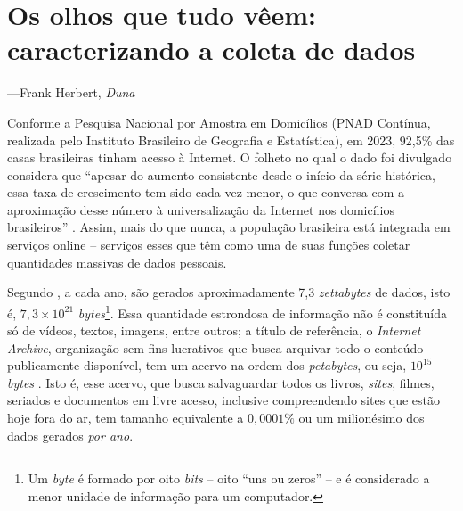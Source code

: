 \chapter{Os olhos que tudo vêem: caracterizando a coleta de dados}

\epigraph{}{---Frank Herbert, \textit{Duna}}

Conforme a Pesquisa Nacional por Amostra em Domicílios (PNAD Contínua, realizada pelo Instituto Brasileiro de Geografia e Estatística), em 2023, 92,5\% das casas brasileiras tinham acesso à Internet. O folheto no qual o dado foi divulgado considera que ``apesar do aumento consistente desde o início da série histórica, essa taxa de crescimento tem sido cada vez menor, o que conversa com a aproximação desse número à universalização da Internet nos domicílios brasileiros'' \cite[p.6]{pnadcontínua_acesso_2024}.
Assim, mais do que nunca, a população brasileira está integrada em serviços online -- serviços esses que têm como uma de suas funções coletar quantidades massivas de dados pessoais.

Segundo \textcite{vopson_information_2020}, a cada ano, são gerados aproximadamente 7,3 \textit{zettabytes} de dados, isto é, $7,3\times10^{21}$ \textit{bytes}\footnote{Um \textit{byte} é formado por oito \textit{bits} -- oito ``uns ou zeros'' -- e é considerado a menor unidade de informação para um computador.}. 
Essa quantidade estrondosa de informação não é constituída só de vídeos, textos, imagens, entre outros; a título de referência, o \textit{Internet Archive}, organização sem fins lucrativos que busca arquivar todo o conteúdo publicamente disponível, tem um acervo na ordem dos \textit{petabytes}, ou seja, $10^{15}$ \textit{bytes} \cite{internetarchive_petabox_}. 
Isto é, esse acervo, que busca salvaguardar todos os livros, \textit{sites}, filmes, seriados e documentos em livre acesso, inclusive compreendendo sites que estão hoje fora do ar, tem tamanho equivalente a $0,0001\%$ ou um milionésimo dos dados gerados \textit{por ano}.

